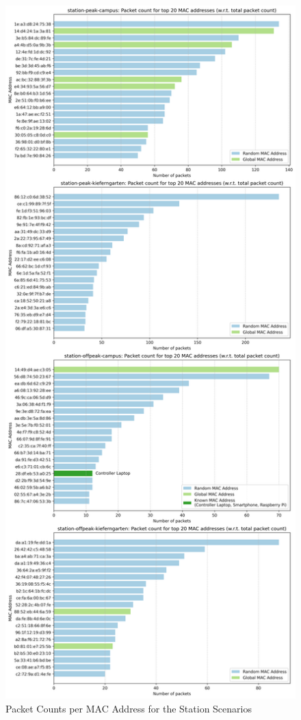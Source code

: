\documentclass[sigconf,nonacm]{acmart}
\begin{document}
\begin{figure}
    \centering
    \includegraphics[width=\columnwidth]{images/part1/packet-counts/top-macs-station-scenarios.png}
    \caption{Packet Counts per MAC Address for the Station Scenarios}
    \label{fig:station_packet_counts_per_mac}
\end{figure}
\end{document}
